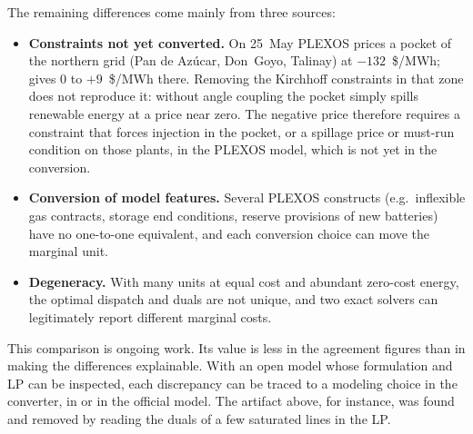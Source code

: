 The remaining differences come mainly from three sources:
\begin{itemize}
  \item \textbf{Constraints not yet converted.}  On 25~May PLEXOS
    prices a pocket of the northern grid (Pan de Az\'ucar, Don~Goyo,
    Talinay) at $-132$~\$/MWh; \gtopt{} gives 0 to $+9$~\$/MWh there.
    Removing the Kirchhoff constraints in that zone does not reproduce
    it: without angle coupling the pocket simply spills renewable energy
    at a price near zero.  The negative price therefore requires a
    constraint that forces injection in the pocket, or a spillage price
    or must-run condition on those plants, in the PLEXOS model, which is
    not yet in the conversion.
  \item \textbf{Conversion of model features.}  Several PLEXOS
    constructs (e.g.\ inflexible gas contracts, storage end conditions,
    reserve provisions of new batteries) have no one-to-one equivalent,
    and each conversion choice can move the marginal unit.
  \item \textbf{Degeneracy.}  With many units at equal cost and
    abundant zero-cost energy, the optimal dispatch and duals are not
    unique, and two exact solvers can legitimately report different
    marginal costs.
\end{itemize}

This comparison is ongoing work.  Its value is less in the agreement
figures than in making the differences explainable.  With an open model
whose formulation and LP can be inspected, each discrepancy can be
traced to a modeling choice in the converter, in \gtopt{} or in the
official model.  The artifact above, for instance, was found and
removed by reading the duals of a few saturated lines in the LP.
